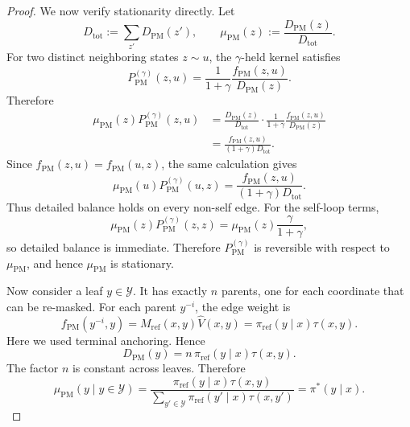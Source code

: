 \documentclass{article}
\numberwithin{theorem}{section}
\numberwithin{proposition}{section}
\numberwithin{corollary}{section}
\numberwithin{lemma}{section}
\numberwithin{conjecture}{section}
\numberwithin{remark}{section}
\numberwithin{definition}{section}
\numberwithin{assumption}{section}
\numberwithin{example}{section}
\newcommand{\calY}{{\mathcal{Y}}}
\providecommand{\base}{\pi_{\mathrm{ref}}}
\begin{document}
\begin{proof}
We now verify stationarity directly. Let
\begin{equation*}
    D_{\mathrm{tot}} := \sum_{z'}D_{\mathrm{PM}}(z'), \qquad \mu_{\mathrm{PM}}(z):=\frac{D_{\mathrm{PM}}(z)}{D_{\mathrm{tot}}}.
\end{equation*}
For two distinct neighboring states $z\sim u$, the $\gamma$-held kernel satisfies
\begin{equation*}
    P_{\mathrm{PM}}^{(\gamma)}(z,u) = \frac{1}{1+\gamma}\frac{f_{\mathrm{PM}}(z,u)}{D_{\mathrm{PM}}(z)}.
\end{equation*}
Therefore
\begin{align*}
    \mu_{\mathrm{PM}}(z)P_{\mathrm{PM}}^{(\gamma)}(z,u)
    &= \frac{D_{\mathrm{PM}}(z)}{D_{\mathrm{tot}}}\cdot \frac{1}{1+\gamma}\frac{f_{\mathrm{PM}}(z,u)}{D_{\mathrm{PM}}(z)} \\
    &= \frac{f_{\mathrm{PM}}(z,u)}{(1+\gamma)D_{\mathrm{tot}}}.
\end{align*}
Since $f_{\mathrm{PM}}(z,u)=f_{\mathrm{PM}}(u,z)$, the same calculation gives
\begin{equation*}
    \mu_{\mathrm{PM}}(u)P_{\mathrm{PM}}^{(\gamma)}(u,z) = \frac{f_{\mathrm{PM}}(z,u)}{(1+\gamma)D_{\mathrm{tot}}}.
\end{equation*}
Thus detailed balance holds on every non-self edge. For the self-loop terms,
\begin{equation*}
    \mu_{\mathrm{PM}}(z)P_{\mathrm{PM}}^{(\gamma)}(z,z) = \mu_{\mathrm{PM}}(z)\frac{\gamma}{1+\gamma},
\end{equation*}
so detailed balance is immediate. Therefore $P_{\mathrm{PM}}^{(\gamma)}$ is reversible with respect to $\mu_{\mathrm{PM}}$, and hence $\mu_{\mathrm{PM}}$ is stationary.

Now consider a leaf $y\in\calY$. It has exactly $n$ parents, one for each coordinate that can be re-masked. For each parent $y^{-i}$, the edge weight is
\begin{equation*}
    f_{\mathrm{PM}}(y^{-i},y) = M_{\text{ref}}(x,y)\widehat V(x,y) = \base(y\mid x)\tau(x,y).
\end{equation*}
Here we used terminal anchoring. Hence
\begin{equation*}
    D_{\mathrm{PM}}(y) = n\,\base(y\mid x)\tau(x,y).
\end{equation*}
The factor $n$ is constant across leaves. Therefore
\begin{equation*}
    \mu_{\mathrm{PM}}(y\mid y\in\calY) = \frac{\base(y\mid x)\tau(x,y)}{\sum_{y'\in\calY}\base(y'\mid x)\tau(x,y')} = \pi^*(y\mid x).
\end{equation*}
\end{proof}
\end{document}
